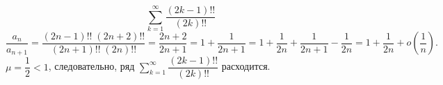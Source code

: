 \documentclass[../../main.tex]{subfiles}
\begin{document}
	
	\begin{example}
		\[ \sum_{k=1}^{\infty} \frac{(2k-1)!!}{(2k)!!}    \]
		\[ \frac{a_n}{a_{n+1}} = \frac{ (2n-1)!! \; (2n+2)!!}{ (2n+1)!! \;  (2n)!! } 
		= \frac{2n+2}{2n+1} = 1 + \frac{1}{2n+1} = 1 + \frac{1}{2n} + \frac{1}{2n+1} 
		- \frac{1}{2n} = 1 + \frac{1}{2n} + o\left( \frac{1}{n} \right). \]
		$\mu = \dfrac{1}{2} < 1$, следовательно, ряд $\sum\limits_{k=1}^{\infty} 
		\dfrac{(2k-1)!!}{(2k)!!}$ расходится.
	\end{example}	
\end{document}
